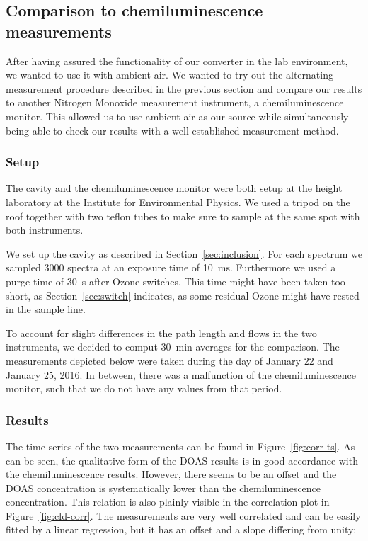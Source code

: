 \subsection{Comparison to chemiluminescence measurements}
\label{sec:cld}

After having assured the functionality of our converter in the lab
environment, we wanted to use it with ambient air. We wanted to try
out the alternating measurement procedure described in the previous
section and compare our results to another Nitrogen Monoxide
measurement instrument, a chemiluminescence monitor. This allowed us to use ambient air as our
 source while simultaneously being able to check our results
with a well established measurement method. 

\subsubsection{Setup}
\label{sec:cld-setup}

The cavity and the chemiluminescence monitor were both setup at the
height laboratory at the Institute for Environmental Physics. We used
a tripod on the roof together with two teflon tubes to make sure to
sample at the same spot with both instruments.

We set up the cavity as described in Section~\ref{sec:inclusion}. For
each spectrum we sampled 3000 spectra at an exposure time of
\SI{10}{\milli\second}. Furthermore we used a purge time of
\SI{30}{\second} after Ozone switches. This time might have been taken
too short, as Section~\ref{sec:switch} indicates, as some residual
Ozone might have rested in the sample line.

To account for slight differences in the path length and flows in the
two instruments, we decided to comput \SI{30}{\minute} averages for
the comparison. The measurements depicted below were taken during the
day of January 22 and January 25, 2016. In between, there was a
malfunction of the chemiluminescence monitor, such that we do not have
any values from that period.

\subsubsection{Results}
\label{sec:cld-results}

The time series of the two measurements can be found in
Figure~\ref{fig:corr-ts}. As can be seen, the qualitative form of the
DOAS results is in good accordance with the chemiluminescence results.
However, there seems to be an offset and the DOAS concentration is
systematically lower than the chemiluminescence concentration. This
relation is also plainly visible in the correlation plot in
Figure~\ref{fig:cld-corr}. The measurements are very well correlated
and can be easily fitted by a linear regression, but it has an offset
and a slope differing from unity:

